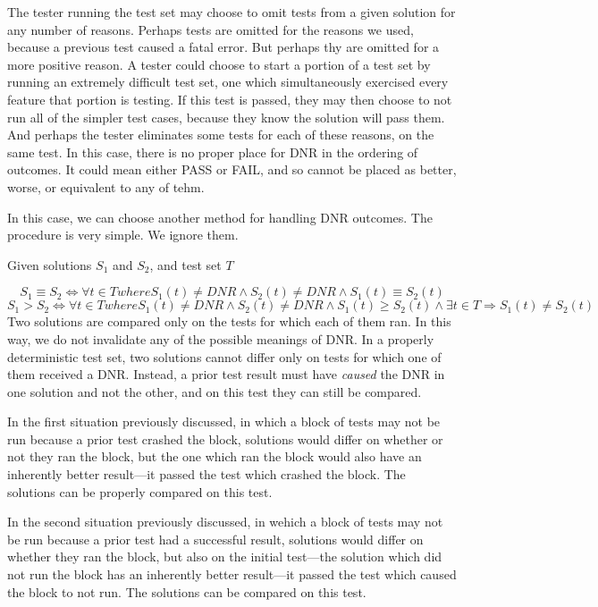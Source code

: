 \documentclass[11pt,twoside]{article}
\begin{document}
The tester running the test set may choose to omit tests from a given solution for any number of reasons. Perhaps tests are omitted for the reasons we used, because a previous test caused a fatal error. But perhaps thy are omitted for a more positive reason. A tester could choose to start a portion of a test set by running an extremely difficult test set, one which simultaneously exercised every feature that portion is testing. If this test is passed, they may then choose to not run all of the simpler test cases, because they know the solution will pass them. And perhaps the tester eliminates some tests for each of these reasons, on the same test. In this case, there is no proper place for DNR in the ordering of outcomes. It could mean either PASS or FAIL, and so cannot be placed as better, worse, or equivalent to any of tehm.

In this case, we can choose another method for handling DNR outcomes. The procedure is very simple. We ignore them.

\centerline{Given solutions $S_1$ and $S_2$, and test set $T$}
$$S_1 \equiv S_2 \iff \forall t \in T where S_1(t) \neq DNR \wedge S_2(t) \neq DNR \wedge S_1(t) \equiv S_2(t)$$
$$S_1 > S_2 \iff \forall t \in T where S_1(t) \neq DNR \wedge S_2(t) \neq DNR \wedge S_1(t) \geq S_2(t) \wedge \exists t \in T \Rightarrow S_1(t) \neq S_2(t)$$
Two solutions are compared only on the tests for which each of them ran. In this way, we do not invalidate any of the possible meanings of DNR. In a properly deterministic test set, two solutions cannot differ only on tests for which one of them received a DNR. Instead, a prior test result must have \emph{caused} the DNR in one solution and not the other, and on this test they can still be compared. 

In the first situation previously discussed, in which a block of tests may not be run because a prior test crashed the block, solutions would differ on whether or not they ran the block, but the one which ran the block would also have an inherently better result---it passed the test which crashed the block. The solutions can be properly compared on this test.

In the second situation previously discussed, in wehich a block of tests may not be run because a prior test had a successful result, solutions would differ on whether they ran the block, but also on the initial test---the solution which did not run the block has an inherently better result---it passed the test which caused the block to not run. The solutions can be compared on this test.
\end{document}

